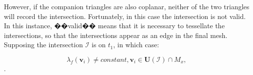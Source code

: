 
However, if the companion triangles are also coplanar, neither of the two triangles will record the intersection. Fortunately, in this case the intersection is not valid. In this instance, ��valid�� means that it is necessary to tessellate the intersections, so that the intersections appear as an edge in the final mesh. Supposing the intersection $\mathcal{I}$ is on $t_1$, in which case:

\begin{equation}
\lambda_f(\bm{v}_i) \neq constant, \bm{v}_i \in \bm{U}(\mathcal{I}) \cap M_x,
\end{equation}
.

